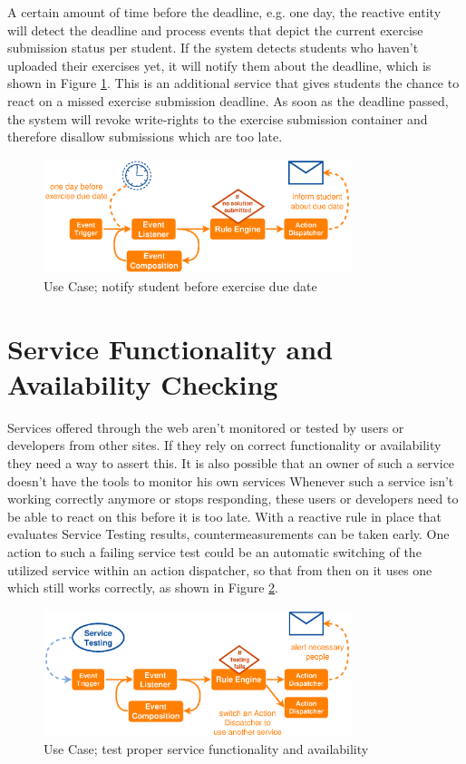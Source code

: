 A certain amount of time before the deadline, e.g. one day, the reactive entity will detect the deadline and process events that depict the current exercise submission status per student.
If the system detects students who haven't uploaded their exercises yet, it will notify them about the deadline, which is shown in Figure \ref{fig:ProBinderExerciseNotification}.
This is an additional service that gives students the chance to react on a missed exercise submission deadline.
As soon as the deadline passed, the system will revoke write-rights to the exercise submission container and therefore disallow submissions which are too late.
\begin{figure}[!ht]
  \centering
  \includegraphics[width=0.8\textwidth]{figures/ProBinderExerciseNotification}
  \caption{Use Case; notify student before exercise due date}
  \label{fig:ProBinderExerciseNotification}
\end{figure}



\section{Service Functionality and Availability Checking}
Services offered through the \textrm{\gls{web}} aren't monitored or tested by users or developers from other sites.
If they rely on correct functionality or availability they need a way to assert this.
It is also possible that an owner of such a service doesn't have the tools to monitor his own services
Whenever such a service isn't working correctly anymore or stops responding, these users or developers need to be able to react on this before it is too late.
With a reactive rule in place that evaluates Service Testing results, countermeasurements can be taken early.
One action to such a failing service test could be an automatic switching of the utilized service within an action dispatcher, so that from then on it uses one which still works correctly, as shown in Figure \ref{fig:ProBinderServiceTesting}.
\begin{figure}[!ht]
  \centering
  \includegraphics[width=0.8\textwidth]{figures/ProBinderServiceTesting}
  \caption{Use Case; test proper service functionality and availability}
  \label{fig:ProBinderServiceTesting}
\end{figure}



